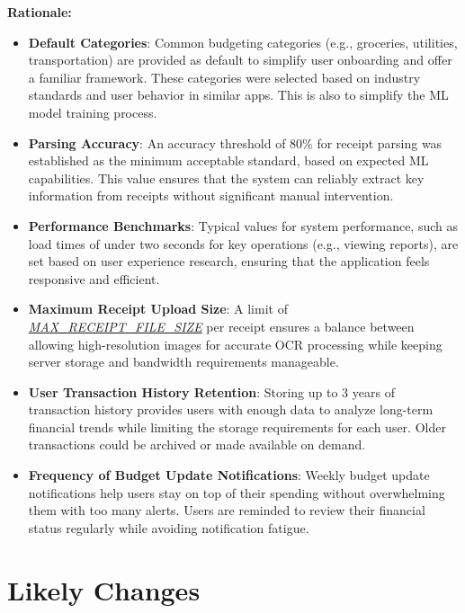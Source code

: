 \documentclass[12pt]{article}
\begin{document}
\noindent\textbf{Rationale:}
\begin{itemize}
    \item \textbf{Default Categories}: Common budgeting categories (e.g.,
    groceries, utilities, transportation) are provided as default to simplify
    user onboarding and offer a familiar framework. These categories were
    selected based on industry standards and user behavior in similar apps. This
    is also to simplify the ML model training process.
    \item \textbf{Parsing Accuracy}: An accuracy threshold of 80\% for receipt
    parsing was established as the minimum acceptable standard, based on
    expected ML capabilities. This value ensures that the system can reliably
    extract key information from receipts without significant manual
    intervention.
    \item \textbf{Performance Benchmarks}: Typical values for system
    performance, such as load times of under two seconds for key operations
    (e.g., viewing reports), are set based on user experience research, ensuring
    that the application feels responsive and efficient.
    \item \textbf{Maximum Receipt Upload Size}: A limit of \hyperref[Table:AuxConstants]{\textit{MAX\_RECEIPT\_FILE\_SIZE}} per receipt
    ensures a balance between allowing high-resolution images for accurate OCR
    processing while keeping server storage and bandwidth requirements
    manageable. 
    \item \textbf{User Transaction History Retention}: Storing up to 3 years of
    transaction history provides users with enough data to analyze long-term
    financial trends while limiting the storage requirements for each user.
    Older transactions could be archived or made available on demand.
    \item \textbf{Frequency of Budget Update Notifications}: Weekly budget
    update notifications help users stay on top of their spending without
    overwhelming them with too many alerts. Users are reminded to review their
    financial status regularly while avoiding notification fatigue.
\end{itemize}

\newpage 

\section{Likely Changes}    
\end{document}
